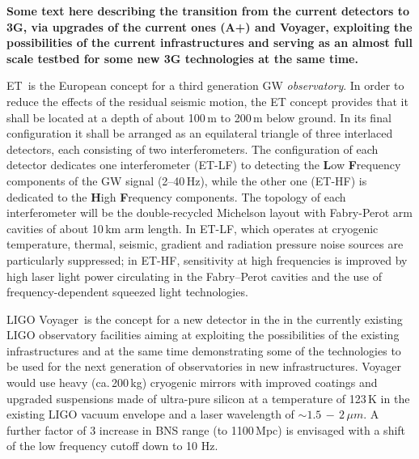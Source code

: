 \textbf{Some text here describing the transition from the current detectors to 3G, via upgrades of the current ones (A+) and Voyager, exploiting the possibilities of the current infrastructures and serving as an almost full scale testbed for some new 3G technologies at the same time.}

\begin{tcolorbox}[standard jigsaw,colback=amber!10!white,colframe=red!70!black,coltext=black, title=The Einstein gravitational--wave Telescope (ET)] ET\,\cite{ET2011} is the European concept for a third generation GW \emph{observatory}. In order to reduce the effects of the residual seismic motion, the ET concept provides that it shall be located at a depth of about 100\,m to 200\,m below ground. In its final configuration it shall be arranged as an equilateral triangle of three interlaced detectors, each consisting of two interferometers. The configuration of each detector dedicates one interferometer (ET-LF) to detecting the \textbf{L}ow \textbf{F}requency components of the GW signal (2--40\,Hz), while the other one (ET-HF) is dedicated to the \textbf{H}igh \textbf{F}requency components. The topology of each interferometer will be the double-recycled Michelson layout with Fabry-Perot arm cavities of about 10\,km arm length. In ET-LF, which operates at cryogenic temperature, thermal, seismic, gradient and radiation pressure noise sources are particularly suppressed; in ET-HF, sensitivity at high frequencies is improved by high laser light power circulating in the Fabry--Perot cavities and the use of frequency-dependent squeezed light technologies.
\end{tcolorbox}



\begin{tcolorbox}[standard jigsaw,colframe=azure!70!black,colback=azure!20!white,opacityback=0.6,coltext=black, title= LIGO Voyager]
LIGO Voyager\,\cite{Voyager:Inst,VoyagerDCC2018} is the concept for a new detector in the in the currently existing LIGO observatory facilities aiming at exploiting the possibilities of the existing infrastructures and at the same time demonstrating some of the technologies to be used for the next generation of observatories in new infrastructures.
Voyager would use heavy (ca.\,200\,kg) cryogenic mirrors with improved coatings and upgraded suspensions made of ultra-pure silicon at a temperature of 123\,K in the existing LIGO vacuum envelope and a laser wavelength of $\sim1.5\,-\,2\,\mu m$. 
A further factor of 3 increase in BNS range (to 1100\,Mpc) is envisaged with a shift of the low frequency cutoff down to 10 Hz.
\end{tcolorbox}

